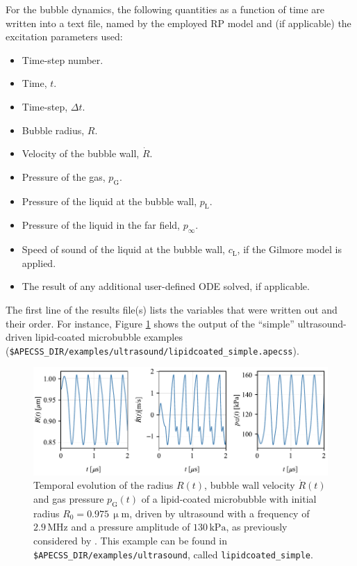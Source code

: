 For the bubble dynamics, the following quantities as a function of time are written into a text file, named by the employed RP model and (if applicable) the excitation parameters used:\vspace{-1em}
\begin{itemize}[noitemsep]
  \item Time-step number.
  \item Time, $t$.
  \item Time-step, $\Delta t$.
  \item Bubble radius, $R$.
  \item Velocity of the bubble wall, $\dot{R}$.
  \item Pressure of the gas, $p_\mathrm{G}$.
  \item Pressure of the liquid at the bubble wall, $p_\mathrm{L}$.
  \item Pressure of the liquid in the far field, $p_\infty$.
  \item Speed of sound of the liquid at the bubble wall, $c_\mathrm{L}$, if the Gilmore model is applied.
  \item The result of any additional user-defined ODE solved, if applicable.
\end{itemize}

The first line of the results file(s) lists the variables that were written out and their order. For instance, Figure \ref{fig:bubble_results} shows the output of the ``simple'' ultrasound-driven lipid-coated microbubble examples ({\tt \$APECSS\_DIR/examples/ultrasound/lipidcoated\_simple.apecss}).

\begin{figure}
    \centering
    \includegraphics[width=\linewidth]{./figures/ultrasound_lipidcoated_simple.pdf}
    \caption{Temporal evolution of the radius $R(t)$, bubble wall velocity $\dot{R}(t)$ and gas pressure $p_\mathrm{G}(t)$ of a lipid-coated microbubble with initial radius $R_0 = 0.975 \, \upmu \mathrm{m}$, driven by ultrasound with a frequency of $2.9 \, \mathrm{MHz}$ and a pressure amplitude of $130 \, \mathrm{kPa}$, as previously considered by \citet{Marmottant2005}. This example can be found in {\tt \$APECSS\_DIR/examples/ultrasound}, called {\tt lipidcoated\_simple}.}
    \label{fig:bubble_results}
\end{figure}